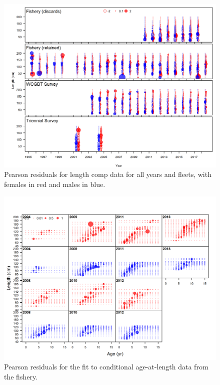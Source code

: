 \documentclass[12pt,]{article}
\begin{document}
\begin{figure}
\centering
\includegraphics{r4ss/plots_mod1/comp_lenfit__multi-fleet_comparison.png}
\caption{Pearson residuals for length comp data for all years and
fleets, with females in red and males in blue.
\label{fig:comp_lenfit__multi-fleet_comparison}}
\end{figure}

\begin{figure}
\centering
\includegraphics{r4ss/plots_mod1/comp_condAALfit_residsflt1mkt2.png}
\caption{Pearson residuals for the fit to conditional age-at-length data
from the fishery. \label{fig:age_fit_fishery}}
\end{figure}
\end{document}
